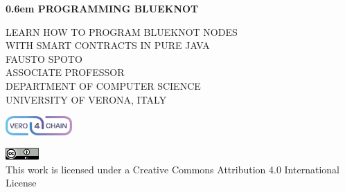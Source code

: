 \BgThispage
\newcommand\nbvspace[1][3]{\vspace*{\stretch{#1}}}
\newcommand\nbstretchyspace{\spaceskip0.5em plus 0.25em minus 0.25em}
\newcommand{\nbtitlestretch}{\spaceskip0.6em}
\pagestyle{empty}
\begin{center}
\bfseries
\nbvspace[1]
\Huge
{\nbtitlestretch\huge
PROGRAMMING BLUEKNOT}

\nbvspace[1]
\normalsize

LEARN HOW TO PROGRAM BLUEKNOT NODES\\
WITH SMART CONTRACTS IN PURE JAVA
\nbvspace[1]\\
\Large FAUSTO SPOTO\\[0.5em]
\footnotesize ASSOCIATE PROFESSOR\\
DEPARTMENT OF COMPUTER SCIENCE\\
UNIVERSITY OF VERONA, ITALY

\nbvspace[2]

\includegraphics[width=1in]{./pics/logo_blueknot_minimal.png}
\nbvspace[2]
\normalsize

\nbvspace[1]
\includegraphics[width=0.5in]{./pics/CC_license.png}\\
\small
This work is licensed under a Creative Commons Attribution 4.0 International License

\end{center}

\newpage

\nbvspace[2]
